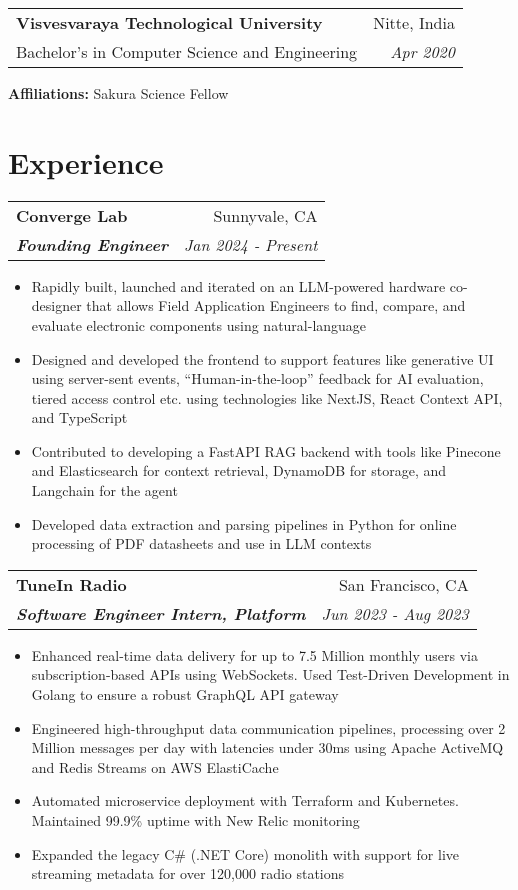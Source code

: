 \documentclass[letterpaper]{article}
\makeatletter
\newcommand{\resumeItemWithoutTitle}[1]{
  \item\small{
    {#1 \vspace{0pt}}
  }
}
\newcommand{\resumeSubheading}[4]{
    \begin{tabular*}{\textwidth}{l@{\extracolsep{\fill}}r}
        \textbf{#1} & #2 \\
        \textbf{\textit{#3}} & \textit{\small #4} \\
    \end{tabular*}\vspace{0pt}
}
\newcommand{\shortSection}[1]{
    \vspace{-6pt}
    \section{#1}
}
\newcommand{\educationHeading}[5]{
    \begin{tabular*}{\textwidth}{l@{\extracolsep{\fill}}r}
        \textbf{#1} & \small #2 \\
        #3 & \textit{\small #4} \\
    \end{tabular*}
    \small{\textbf{Affiliations:}{#5}}
}
\newcommand{\resumeItemListStart}{\begin{itemize}}
\newcommand{\resumeItemListEnd}{\end{itemize}}
\makeatother
\begin{document}
\vspace{5pt}
\educationHeading
{Visvesvaraya Technological University}{Nitte, India}
{Bachelor's in Computer Science and Engineering}{Apr 2020}{
  Sakura Science Fellow
}


\shortSection{Experience}
\vspace{3pt}
\resumeSubheading
{Converge Lab}{Sunnyvale, CA}
{Founding Engineer}{Jan 2024 - Present}
\resumeItemListStart
\resumeItemWithoutTitle{Rapidly built, launched and iterated on an LLM-powered hardware co-designer that allows Field Application Engineers to find, compare, and evaluate electronic components using natural-language}
\resumeItemWithoutTitle{Designed and developed the frontend to support features like generative UI using server-sent events, ``Human-in-the-loop'' feedback for AI evaluation, tiered access control etc. using technologies like NextJS, React Context API, and TypeScript}
\resumeItemWithoutTitle{Contributed to developing a FastAPI RAG backend with tools like Pinecone and Elasticsearch for context retrieval, DynamoDB for storage, and Langchain for the agent}
\resumeItemWithoutTitle{Developed data extraction and parsing pipelines in Python for online processing of PDF datasheets and use in LLM contexts}
\resumeItemListEnd

\vspace{3pt}
\resumeSubheading
{TuneIn Radio}{San Francisco, CA}
{Software Engineer Intern, Platform}{Jun 2023 - Aug 2023}
\resumeItemListStart
\resumeItemWithoutTitle{Enhanced real-time data delivery for up to 7.5 Million monthly users via subscription-based APIs using WebSockets. Used Test-Driven Development in Golang to ensure a robust GraphQL API gateway}
\resumeItemWithoutTitle{Engineered high-throughput data communication pipelines, processing over 2 Million messages per day with latencies under 30ms using Apache ActiveMQ and Redis Streams on AWS ElastiCache}
\resumeItemWithoutTitle{Automated microservice deployment with Terraform and Kubernetes. Maintained 99.9\% uptime with New Relic monitoring}
\resumeItemWithoutTitle{Expanded the legacy C\# (.NET Core) monolith with support for live streaming metadata for over 120,000 radio stations}
\resumeItemListEnd
\end{document}
